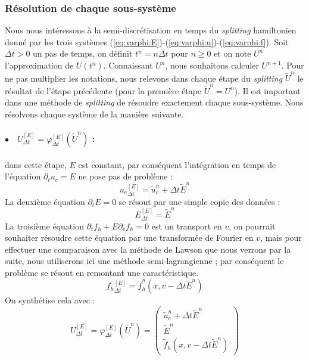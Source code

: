 \subsubsection{Résolution de chaque sous-système}

Nous nous intéressons à la semi-discrétisation en temps du \emph{splitting} hamiltonien donné par les trois systèmes (\ref{eq:varphi:E})-(\ref{eq:varphi:u})-(\ref{eq:varphi:f}). Soit $\Delta t>0$ un pas de temps, on définit $t^n=n\Delta t$ pour $n\geq 0$ et on note $U^n$ l'approximation de $U(t^n)$. Connaissant $U^n$, nous souhaitons calculer $U^{n+1}$. Pour ne pas multiplier les notations, nous relevons dans chaque étape du \emph{splitting} $\tilde{U}^n$ le résultat de l'étape précédente (pour la première étape $\tilde{U}^n=U^n$). Il est important dans une méthode de \emph{splitting} de résoudre exactement chaque sous-système. Nous résolvons chaque système de la manière suivante.

\paragraph{$\bullet\quad U^{[E]}_{\Delta t} = \varphi^{[E]}_{\Delta t}(\tilde{U}^n)$ :} dans cette étape, $E$ est constant, par conséquent l'intégration en temps de l'équation $\partial_t u_c = E$ ne pose pas de problème :
$$
  {u_c}^{[E]}_{\Delta t} = \tilde{u}_c^n + \Delta t \tilde{E}^n
$$
La deuxième équation $\partial_t E = 0$ se résout par une simple copie des données :
$$
  E^{[E]}_{\Delta t} = \tilde{E}^n
$$
La troisième équation $\partial_t f_h+E\partial_vf_h=0$ est un transport en $v$, on pourrait souhaiter résoudre cette équation par une transformée de Fourier en $v$, mais pour effectuer une comparaison avec la méthode de Lawson que nous verrons par la suite, nous utiliserons ici une méthode semi-lagrangienne ; par conséquent le problème se résout en remontant une caractéristique.
$$
  {f_h}^{[E]}_{\Delta t} = \tilde{f}_h^n(x,v-\Delta t\tilde{E}^n)
$$
On synthétise cela avec :
$$
  U^{[E]}_{\Delta t} = \varphi^{[E]}_{\Delta t}(\tilde{U}^n)
  = \begin{pmatrix}
      \tilde{u}_c^n + \Delta t \tilde{E}^n \\
      \tilde{E}^n \\
      \tilde{f}_h (x,v-\Delta t \tilde{E}^n)
    \end{pmatrix}
$$

